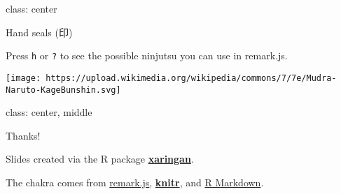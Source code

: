 \documentclass[ignorenonframetext,]{beamer}
\begin{document}
\begin{frame}

class: center

\end{frame}

\begin{frame}[fragile]{Hand seals (印)}
\protect\hypertarget{hand-seals-}{}

Press \texttt{h} or \texttt{?} to see the possible ninjutsu you can use
in remark.js.

\texttt{[image: https://upload.wikimedia.org/wikipedia/commons/7/7e/Mudra-Naruto-KageBunshin.svg]}

\end{frame}

\begin{frame}

class: center, middle

\end{frame}

\begin{frame}{Thanks!}
\protect\hypertarget{thanks}{}

Slides created via the R package
\href{https://github.com/yihui/xaringan}{\textbf{xaringan}}.

The chakra comes from \href{https://remarkjs.com}{remark.js},
\href{http://yihui.name/knitr}{\textbf{knitr}}, and
\href{https://rmarkdown.rstudio.com}{R Markdown}.

\end{frame}
\end{document}
